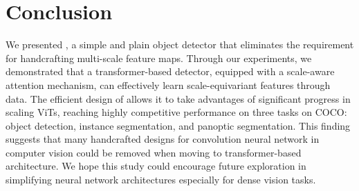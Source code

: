 
\section{Conclusion}
\label{sec:conclusion}

We presented \ours, a simple and plain object detector that eliminates the requirement for handcrafting multi-scale feature maps. Through our experiments, we demonstrated that a transformer-based detector, equipped with a scale-aware attention mechanism, can effectively learn scale-equivariant features through data. The efficient design of \ours allows it to take advantages of significant progress in scaling ViTs, reaching highly competitive performance on three tasks on COCO: object detection, instance segmentation, and panoptic segmentation. This finding suggests that many handcrafted designs for convolution neural network in computer vision could be removed when moving to transformer-based architecture. We hope this study could encourage future exploration in simplifying neural network architectures especially for dense vision tasks.
